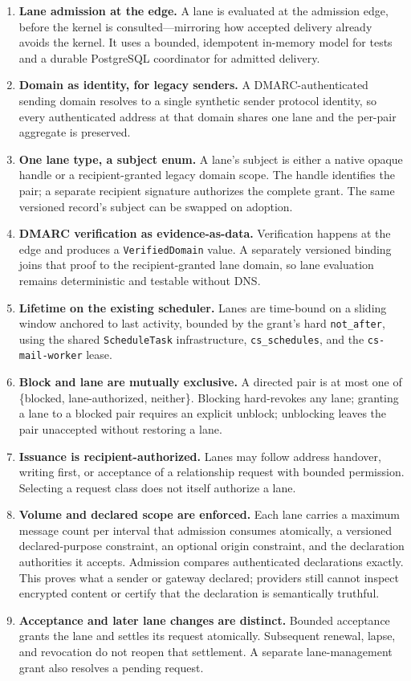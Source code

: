 \documentclass[11pt]{article}
\begin{document}
\begin{enumerate}[leftmargin=2em]
    \item \textbf{Lane admission at the edge.} A lane is evaluated at the
    admission edge, before the kernel is consulted---mirroring how accepted
    delivery already avoids the kernel. It uses a bounded, idempotent in-memory model for tests and a durable
    PostgreSQL coordinator for admitted delivery.
    \item \textbf{Domain as identity, for legacy senders.} A DMARC-authenticated
    sending domain resolves to a single synthetic sender protocol identity, so
    every authenticated address at that domain shares one lane and the per-pair
    aggregate is preserved.
    \item \textbf{One lane type, a subject enum.} A lane's subject is either a
    native opaque handle or a recipient-granted legacy domain scope. The handle
    identifies the pair; a separate recipient signature authorizes the complete
    grant. The same versioned record's subject can be swapped on adoption.
    \item \textbf{DMARC verification as evidence-as-data.} Verification happens at
    the edge and produces a \texttt{VerifiedDomain} value. A separately
    versioned binding joins that proof to the recipient-granted lane domain, so
    lane evaluation remains deterministic and testable without DNS.
    \item \textbf{Lifetime on the existing scheduler.} Lanes are time-bound on a
    sliding window anchored to last activity, bounded by the grant's hard
    \texttt{not\_after}, using the shared \texttt{ScheduleTask} infrastructure,
    \texttt{cs\_schedules}, and the \texttt{cs-mail-worker} lease.
    \item \textbf{Block and lane are mutually exclusive.} A directed pair is at
    most one of \{blocked, lane-authorized, neither\}. Blocking hard-revokes any
    lane; granting a lane to a blocked pair requires an explicit unblock;
    unblocking leaves the pair unaccepted without restoring a lane.
    \item \textbf{Issuance is recipient-authorized.} Lanes may follow address
    handover, writing first, or acceptance of a relationship request with bounded
    permission. Selecting a request class does not itself authorize a lane.
    \item \textbf{Volume and declared scope are enforced.} Each lane carries a
    maximum message count per interval that admission consumes atomically, a
    versioned declared-purpose constraint, an optional origin constraint, and the
    declaration authorities it accepts. Admission compares authenticated
    declarations exactly. This proves what a sender or gateway declared; providers
    still cannot inspect encrypted content or certify that the declaration is
    semantically truthful.
    \item \textbf{Acceptance and later lane changes are distinct.} Bounded
    acceptance grants the lane and settles its request atomically. Subsequent
    renewal, lapse, and revocation do not reopen that settlement. A separate
    lane-management grant also resolves a pending request.
\end{enumerate}
\end{document}
